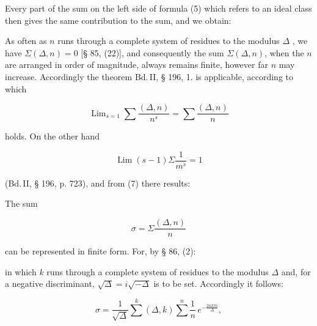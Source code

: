 Every part of the sum on the left side of formula (5) which
refers to an ideal class then gives the same contribution
to the sum, and we obtain:



As often as $n$ runs through a complete system of residues to the modulus $\Delta$
, we have $\Sigma(\Delta,n) = 0$ [§ 85, (22)], and consequently the sum
$\Sigma(\Delta,n)$, when the $n$ are arranged in order of magnitude,
always remains finite, however far $n$ may increase. Accordingly the theorem Bd.\,II,
§ 196, 1. is applicable, according to which

\[
\operatorname{Lim}_{s=1}\sum\frac{(\Delta,n)}{n^s} = \sum\frac{(\Delta,n)}{n}
\]

holds. On the other hand

\[
\operatorname{Lim}(s-1)\Sigma\frac{1}{m^s} = 1
\]

(Bd.\,II, § 196, p. 723), and from (7) there results:


The sum

\[
\sigma = \Sigma\frac{(\Delta,n)}{n}
\]

can be represented in finite form. For, by
§ 86, (2):


in which $k$ runs through a complete system of residues to the modulus $\Delta$
 and, for a negative discriminant, $\sqrt{\Delta} = i\sqrt{-\Delta}$ is to be
set. Accordingly it follows:

\[
\sigma = \frac{1}{\sqrt{\Delta}}\sum_{}^{k}(\Delta,k)\sum_{}^{n}\frac{1}{n}\,e^{-\frac{2nk\pi i}{\Delta}},
\]
